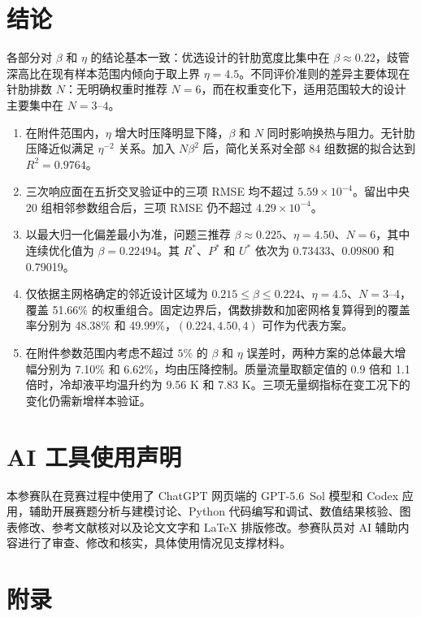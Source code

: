 \documentclass[withoutpreface,bwprint]{cumcmthesis}
\newcommand{\Rstar}{R^{*}}
\newcommand{\Pstar}{P^{*}}
\newcommand{\Ustar}{U^{*}}
\begin{document}
\section{结论}
各部分对 $\beta$ 和 $\eta$ 的结论基本一致：优选设计的针肋宽度比集中在 $\beta\approx0.22$，歧管深高比在现有样本范围内倾向于取上界 $\eta=4.5$。不同评价准则的差异主要体现在针肋排数 $N$：无明确权重时推荐 $N=6$，而在权重变化下，适用范围较大的设计主要集中在 $N=3$--$4$。
\begin{enumerate}
  \item 在附件范围内，$\eta$ 增大时压降明显下降，$\beta$ 和 $N$ 同时影响换热与阻力。无针肋压降近似满足 $\eta^{-2}$ 关系。加入 $N\beta^2$ 后，简化关系对全部 84 组数据的拟合达到 $R^2=0.9764$。
  \item 三次响应面在五折交叉验证中的三项 RMSE 均不超过 $5.59\times10^{-4}$。留出中央 20 组相邻参数组合后，三项 RMSE 仍不超过 $4.29\times10^{-4}$。
  \item 以最大归一化偏差最小为准，问题三推荐 $\beta\approx0.225$、$\eta=4.50$、$N=6$，其中连续优化值为 $\beta=0.22494$。其 $\Rstar$、$\Pstar$ 和 $\Ustar$ 依次为 0.73433、0.09800 和 0.79019。
  \item 仅依据主网格确定的邻近设计区域为 $0.215\leq\beta\leq0.224$、$\eta=4.5$、$N=3$--4，覆盖 51.66\% 的权重组合。固定边界后，偶数排数和加密网格复算得到的覆盖率分别为 48.38\% 和 49.99\%，$(0.224,4.50,4)$ 可作为代表方案。
  \item 在附件参数范围内考虑不超过 $5\%$ 的 $\beta$ 和 $\eta$ 误差时，两种方案的总体最大增幅分别为 7.10\% 和 6.62\%，均由压降控制。质量流量取额定值的 0.9 倍和 1.1 倍时，冷却液平均温升约为 9.56 K 和 7.83 K。三项无量纲指标在变工况下的变化仍需新增样本验证。
\end{enumerate}

\section*{AI 工具使用声明}
本参赛队在竞赛过程中使用了 ChatGPT 网页端的 \mbox{GPT-5.6 Sol} 模型和 Codex 应用，辅助开展赛题分析与建模讨论、Python 代码编写和调试、数值结果核验、图表修改、参考文献核对以及论文文字和 \LaTeX{} 排版修改。参赛队员对 AI 辅助内容进行了审查、修改和核实，具体使用情况见支撑材料。


\setlength{\bibsep}{0.25em}


\clearpage
\section{附录}
\setcounter{subsection}{0}
\renewcommand{\thesubsection}{\Alph{subsection}}
\end{document}
